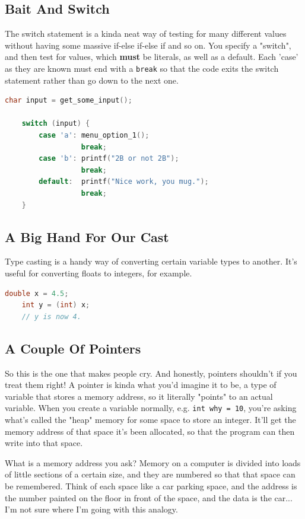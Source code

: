 \subsection{Bait And Switch}
The switch statement is a kinda neat way of testing for many different values without having some massive if-else if-else if and so on. You specify a "switch", and then test for values, which \textbf{must} be literals, as well as a default. Each 'case' as they are known must end with a \texttt{break} so that the code exits the switch statement rather than go down to the next one.
\begin{lstlisting}[language=C]
    char input = get_some_input();

    switch (input) {
        case 'a': menu_option_1();
                  break;
        case 'b': printf("2B or not 2B");
                  break;
        default:  printf("Nice work, you mug.");
                  break;
    }
\end{lstlisting}

\subsection{A Big Hand For Our Cast}
Type casting is a handy way of converting certain variable types to another. It's useful for converting floats to integers, for example.
\begin{lstlisting}[language=C]
    double x = 4.5;
    int y = (int) x;
    // y is now 4.
\end{lstlisting}

\subsection{A Couple Of Pointers}
So this is the one that makes people cry. And honestly, pointers shouldn't if you treat them right! A pointer is kinda what you'd imagine it to be, a type of variable that stores a memory address, so it literally "points" to an actual variable. When you create a variable normally, e.g. \texttt{int why = 10}, you're asking what's called the "heap" memory for some space to store an integer. It'll get the memory address of that space it's been allocated, so that the program can then write into that space.

What is a memory address you ask? Memory on a computer is divided into loads of little sections of a certain size, and they are numbered so that that space can be remembered. Think of each space like a car parking space, and the address is the number painted on the floor in front of the space, and the data is the car... I'm not sure where I'm going with this analogy.

